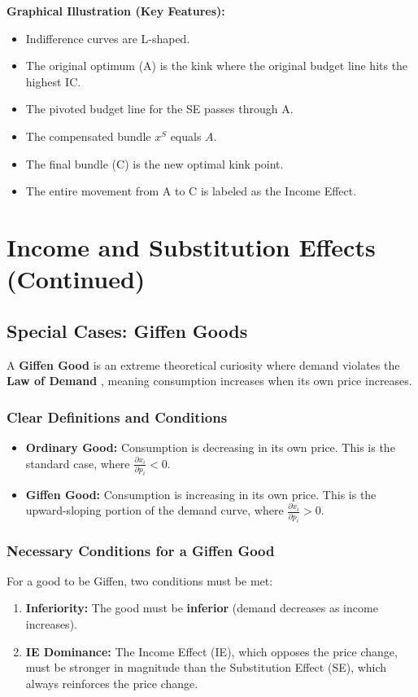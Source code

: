 \documentclass{article}
\begin{document}
\textbf{Graphical Illustration (Key Features):}
\begin{itemize}
    \item Indifference curves are L-shaped.
    \item The original optimum (A) is the kink where the original budget line hits the highest IC.
    \item The pivoted budget line for the SE passes through A.
    \item The compensated bundle $x^S$ equals $A$.
    \item The final bundle (C) is the new optimal kink point.
    \item The entire movement from A to C is labeled as the Income Effect.
\end{itemize}

\hrulefill

\section{Income and Substitution Effects (Continued)}

\subsection{Special Cases: Giffen Goods}

A \textbf{Giffen Good} is an extreme theoretical curiosity where demand violates the \textbf{Law of Demand} , meaning consumption increases when its own price increases.

\subsubsection*{Clear Definitions and Conditions}
\begin{itemize}
    \item \textbf{Ordinary Good:} Consumption is decreasing in its own price. This is the standard case, where $\frac{\partial x_i}{\partial p_i} < 0$.
    \item \textbf{Giffen Good:} Consumption is increasing in its own price. This is the upward-sloping portion of the demand curve, where $\frac{\partial x_i}{\partial p_i} > 0$.
\end{itemize}

\subsubsection*{Necessary Conditions for a Giffen Good}
For a good to be Giffen, two conditions must be met:
\begin{enumerate}
    \item \textbf{Inferiority:} The good must be \textbf{inferior} (demand decreases as income increases).
    \item \textbf{IE Dominance:} The Income Effect (IE), which opposes the price change, must be stronger in magnitude than the Substitution Effect (SE), which always reinforces the price change.
\end{enumerate}
\end{document}

